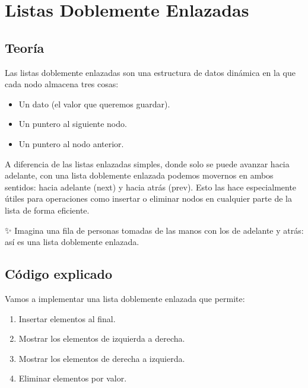 \documentclass[
  11pt,
  a4paper,
  DIV=11,
  numbers=noendperiod]{scrreprt}
\providecommand{\tightlist}{%
  \setlength{\itemsep}{0pt}\setlength{\parskip}{0pt}}
\begin{document}
\chapter{Listas Doblemente Enlazadas}\label{listas-doblemente-enlazadas}

\section{Teoría}\label{teoruxeda-3}

Las listas doblemente enlazadas son una estructura de datos dinámica en
la que cada nodo almacena tres cosas:

\begin{itemize}
\tightlist
\item
  Un dato (el valor que queremos guardar).
\item
  Un puntero al siguiente nodo.
\item
  Un puntero al nodo anterior.
\end{itemize}

A diferencia de las listas enlazadas simples, donde solo se puede
avanzar hacia adelante, con una lista doblemente enlazada podemos
movernos en ambos sentidos: hacia adelante (next) y hacia atrás (prev).
Esto las hace especialmente útiles para operaciones como insertar o
eliminar nodos en cualquier parte de la lista de forma eficiente.

✨ Imagina una fila de personas tomadas de las manos con los de adelante
y atrás: así es una lista doblemente enlazada.

\section{Código explicado}\label{cuxf3digo-explicado}

Vamos a implementar una lista doblemente enlazada que permite:

\begin{enumerate}
\def\labelenumi{\arabic{enumi}.}
\tightlist
\item
  Insertar elementos al final.
\item
  Mostrar los elementos de izquierda a derecha.
\item
  Mostrar los elementos de derecha a izquierda.
\item
  Eliminar elementos por valor.
\end{enumerate}
\end{document}
